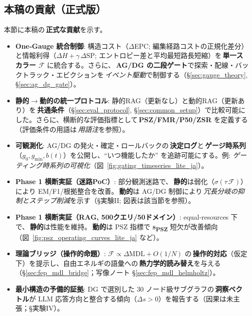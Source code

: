 \documentclass[ja=standard,xelatex]{bxjsarticle}
\newcommand{\F}{\mathcal{F}}
\begin{document}
\subsection{本稿の貢献（正式版）}\label{sec:contributions_formal}
本節に本稿の\,\textbf{正式な貢献}を示す。
\begin{itemize}[leftmargin=1.6em]
  \item \textbf{One‑Gauge 統合制御}: \;構造コスト（$\Delta$EPC; 編集経路コストの正規化差分）と情報利得（$\Delta H{+}\gamma\,\Delta\mathrm{SP}$; エントロピー差と平均最短路長短縮）を\,\textbf{単一スカラー $\F$} に統合する。さらに、\,\textbf{AG/DG の二段ゲート}で探索・配線・バックトラック・エビクションを\,\emph{イベント駆動}で制御する（§\ref{sec:gauge_theory}, §\ref{sec:ag_dg_gate}）。

  \item \textbf{静的$\to$動的の統一プロトコル}: \;静的RAG（更新なし）と動的RAG（更新あり）を\,\textbf{共通条件}（§\ref{sec:eval_protocol}, §\ref{sec:common_setup}）で比較可能にした。\;さらに、横断的な評価指標として\,\textbf{PSZ/FMR/P50/ZSR} を定義する（評価条件の用語は\,\emph{用語注}を参照）。

  \item \textbf{可観測化}: \;AG/DG の発火・確定・ロールバックの\,\textbf{決定ログ}と\,\textbf{ゲージ時系列}（$g_0, g_{\min}, b(t)$）を公開し、“いつ機能したか” を追跡可能にする。例: \emph{ゲーティング時系列の可視化}（図~\ref{fig:gating_timeseries_lite_ja}）。

  \item \textbf{Phase 1 横断実証（迷路PoC）}: \;部分観測迷路で、\,\textbf{静的}は弱化（$\sigma(\tau\,\F)$）により EM/F1/根拠整合を改善。\,\textbf{動的}は AG/DG 制御により\,\emph{冗長分岐の抑制とステップ削減}を示す（§実験II; 図表は該当節を参照）。

  \item \textbf{Phase 1 横断実証（RAG, 500クエリ/50ドメイン）}: \;equal‑resources 下で、\,\textbf{静的}は性能を維持。\,\textbf{動的}は PSZ 指標で \textbf{s\textsubscript{PSZ}} 短欠が改善傾向（図~\ref{fig:psz_operating_curves_lite_ja} など）。

  \item \textbf{理論ブリッジ（操作的命題）}: \;$\F\propto\Delta\mathrm{MDL}{+}O(1/N)$ の\,\textbf{操作的対応}（仮定下）を提示し、自由エネルギの語彙への\,\textbf{熱力学的読み替え}を与える（§\ref{sec:fep_mdl_bridge}；写像ノート §\ref{sec:fep_mdl_helmholtz}）。

  \item \textbf{最小構造の予備的証拠}: \;DG で選別した 30 ノード級サブグラフの\,\textbf{洞察ベクトル}が LLM 応答方向と整合する傾向（$\Delta s{>}0$）を報告する（因果は未主張；§実験IV）。
\end{itemize}
\end{document}
